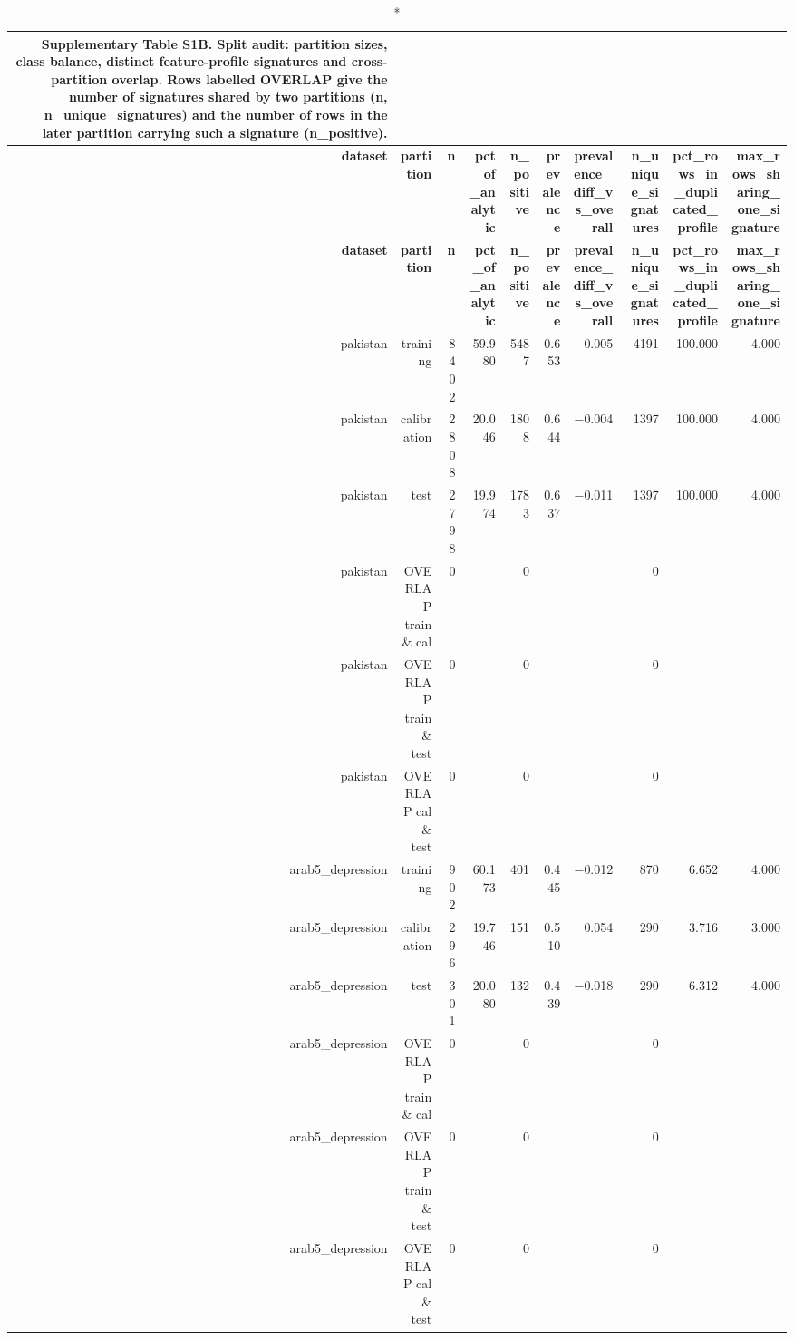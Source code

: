 \documentclass[10pt]{article}
\begin{document}
\tiny
\setlength{\tabcolsep}{2pt}
\begin{longtable}{rrrrrrrrrr}
\caption*{\textbf{Supplementary Table S1B.} Split audit: partition sizes, class balance, distinct feature-profile signatures and cross-partition overlap. Rows labelled OVERLAP give the number of signatures shared by two partitions (n, n\_unique\_signatures) and the number of rows in the later partition carrying such a signature (n\_positive).}\\
\toprule
\textbf{dataset} & \textbf{partition} & \textbf{n} & \textbf{pct\_of\_analytic} & \textbf{n\_positive} & \textbf{prevalence} & \textbf{prevalence\_diff\_vs\_overall} & \textbf{n\_unique\_signatures} & \textbf{pct\_rows\_in\_duplicated\_profile} & \textbf{max\_rows\_sharing\_one\_signature} \\
\midrule
\endfirsthead
\toprule
\textbf{dataset} & \textbf{partition} & \textbf{n} & \textbf{pct\_of\_analytic} & \textbf{n\_positive} & \textbf{prevalence} & \textbf{prevalence\_diff\_vs\_overall} & \textbf{n\_unique\_signatures} & \textbf{pct\_rows\_in\_duplicated\_profile} & \textbf{max\_rows\_sharing\_one\_signature} \\
\midrule
\endhead
\bottomrule
\endfoot
pakistan & training & 8402 & 59.980 & 5487 & 0.653 & 0.005 & 4191 & 100.000 & 4.000 \\
pakistan & calibration & 2808 & 20.046 & 1808 & 0.644 & $-$0.004 & 1397 & 100.000 & 4.000 \\
pakistan & test & 2798 & 19.974 & 1783 & 0.637 & $-$0.011 & 1397 & 100.000 & 4.000 \\
pakistan & OVERLAP train \& cal & 0 &  & 0 &  &  & 0 &  &  \\
pakistan & OVERLAP train \& test & 0 &  & 0 &  &  & 0 &  &  \\
pakistan & OVERLAP cal \& test & 0 &  & 0 &  &  & 0 &  &  \\
arab5\_depression & training & 902 & 60.173 & 401 & 0.445 & $-$0.012 & 870 & 6.652 & 4.000 \\
arab5\_depression & calibration & 296 & 19.746 & 151 & 0.510 & 0.054 & 290 & 3.716 & 3.000 \\
arab5\_depression & test & 301 & 20.080 & 132 & 0.439 & $-$0.018 & 290 & 6.312 & 4.000 \\
arab5\_depression & OVERLAP train \& cal & 0 &  & 0 &  &  & 0 &  &  \\
arab5\_depression & OVERLAP train \& test & 0 &  & 0 &  &  & 0 &  &  \\
arab5\_depression & OVERLAP cal \& test & 0 &  & 0 &  &  & 0 &  &  \\

\end{longtable}
\end{document}
